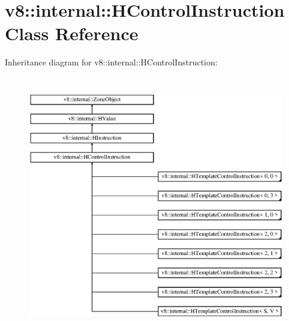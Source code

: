 \hypertarget{classv8_1_1internal_1_1_h_control_instruction}{}\section{v8\+:\+:internal\+:\+:H\+Control\+Instruction Class Reference}
\label{classv8_1_1internal_1_1_h_control_instruction}
Inheritance diagram for v8\+:\+:internal\+:\+:H\+Control\+Instruction\+:\begin{figure}[H]
\begin{center}
\leavevmode
\includegraphics[height=11.351351cm]{classv8_1_1internal_1_1_h_control_instruction}
\end{center}
\end{figure}
